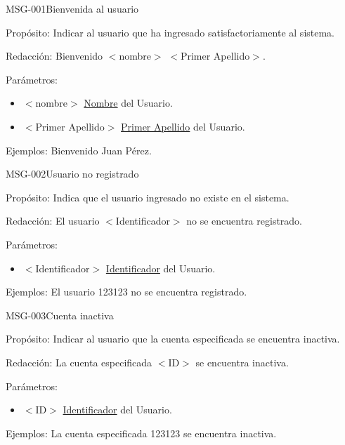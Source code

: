 

\begin{cdtMessage}[msgInfoColor]{MSG-001}{Bienvenida al usuario}
	\item[Propósito:] Indicar al usuario que ha ingresado satisfactoriamente al sistema.
	\item[Redacción:] Bienvenido $<$nombre$>$ $<$Primer Apellido$>$.
	\item[Parámetros:] \hspace{1cm}
	\begin{itemize}
		\item $<$nombre$>$ \hyperlink{Usuario.nombre}{Nombre} del Usuario.
  \item $<$Primer Apellido$>$ \hyperlink{Usuario.primerApellido}{Primer Apellido} del Usuario.
	\end{itemize}
	\item[Ejemplos:] Bienvenido Juan Pérez.
\end{cdtMessage}

\begin{cdtMessage}[msgErrorColor]{MSG-002}{Usuario no registrado} 
	\item[Propósito:] Indica que el usuario ingresado no existe en el sistema.
	\item[Redacción:] El usuario $<$Identificador$>$ no se encuentra registrado.
	\item[Parámetros:] \hspace{1cm}
	\begin{itemize}
		\item $<$Identificador$>$ \hyperlink{Usuario.ID}{Identificador} del Usuario.
	\end{itemize}
	\item[Ejemplos:] El usuario 123123 no se encuentra registrado.
\end{cdtMessage}

\begin{cdtMessage}[msgErrorColor]{MSG-003}{Cuenta inactiva} 
	\item[Propósito:] Indicar al usuario que la cuenta especificada se encuentra inactiva.
	\item[Redacción:] La cuenta especificada $<$ID$>$ se encuentra inactiva.
	\item[Parámetros:] \hspace{1cm}
	\begin{itemize}
		\item $<$ID$>$ \hyperlink{Usuario.ID}{Identificador} del Usuario.
	\end{itemize}
	\item[Ejemplos:] La cuenta especificada 123123 se encuentra inactiva.
\end{cdtMessage}

